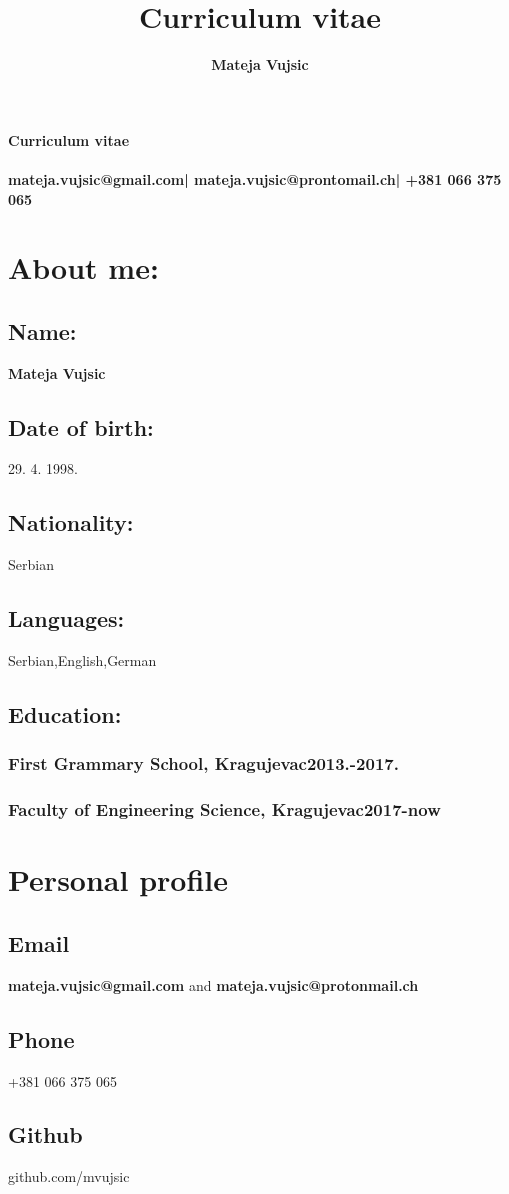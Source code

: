 \documentclass[10pt]{article}
\title{Curriculum vitae}
\author{\textbf{Mateja Vujsic}}
\makeatletter
\renewcommand{\maketitle}{
	\begin{center}
	{\Large\textbf{Curriculum vitae}}\\
	\vspace{.62em}
	{\huge\bfseries\theauthor}\\
	\vspace{.62em}
	{\bfseries{mateja.vujsic@gmail.com| mateja.vujsic@prontomail.ch| +381 066 375 065}}
	\end{center}
}
\makeatother
\begin{document}
\maketitle

\section{About me:}
\subsection{\large{Name:}}
\textbf{\large{Mateja Vujsic}}
\subsection{\large{Date of birth:}}
\large{29. 4. 1998.}
\subsection{\large{Nationality:}}
\large{Serbian}
\subsection{\large{Languages:}}
\large{Serbian,English,German}
\subsection{\large{Education:}}
\subsubsection{First Grammary School, Kragujevac\hfill 2013.-2017.}
\subsubsection{Faculty of Engineering Science, Kragujevac\hfill 2017-now}

\section{Personal profile}
\subsection{Email}
\textbf{mateja.vujsic@gmail.com} and \textbf{mateja.vujsic@protonmail.ch}
\subsection{Phone}
+381 066 375 065
\subsection{Github}
github.com/mvujsic
\end{document}
